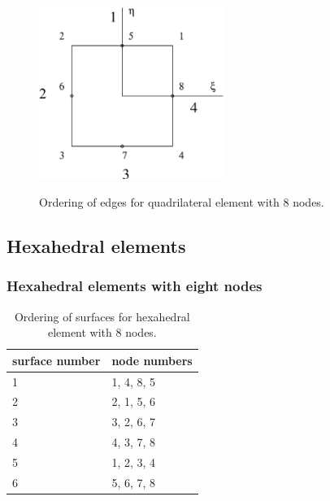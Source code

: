 \begin{figure}[h]
\begin{center}
\includegraphics[width=60mm]{FIG/quadquadedges.eps}
\label{figquadquadedges}
\caption{Ordering of edges for quadrilateral element with 8 nodes.}
\end{center}
\end{figure}

\subsection{Hexahedral elements}

\subsubsection{Hexahedral elements with eight nodes}

\begin{table}[h]
\begin{center}
\begin{tabular}{|l|l|}
\hline
surface number & node numbers
\\ \hline
1 & 1, 4, 8, 5
\\ \hline
2 & 2, 1, 5, 6
\\ \hline
3 & 3, 2, 6, 7
\\ \hline
4 & 4, 3, 7, 8
\\ \hline
5 & 1, 2, 3, 4
\\ \hline
6 & 5, 6, 7, 8
\\ \hline
\end{tabular}
\label{tablinhexsurf}
\caption{Ordering of surfaces for hexahedral element with 8 nodes.}
\end{center}
\end{table}


